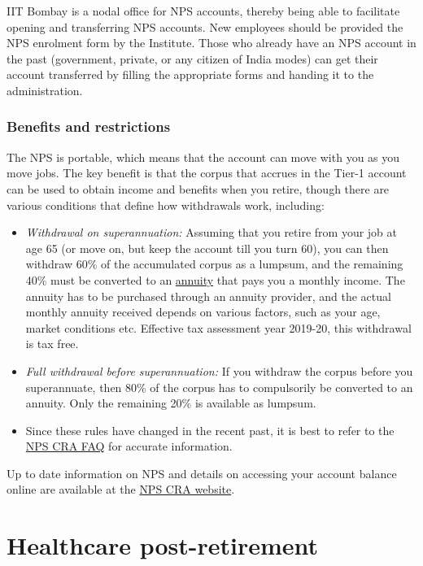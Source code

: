 \documentclass[
  10pt,
  a5paper,
  10pt,
  openany]{amsbook}
\begin{document}
IIT Bombay is a nodal office for NPS accounts, thereby being able to
facilitate opening and transferring NPS accounts. New employees should
be provided the NPS enrolment form by the Institute. Those who already
have an NPS account in the past (government, private, or any citizen of
India modes) can get their account transferred by filling the
appropriate forms and handing it to the administration.

\subsubsection{Benefits and
restrictions}\label{benefits-and-restrictions}

The NPS is portable, which means that the account can move with you as
you move jobs. The key benefit is that the corpus that accrues in the
Tier-1 account can be used to obtain income and benefits when you
retire, though there are various conditions that define how withdrawals
work, including:

\begin{itemize}
\item
  \emph{Withdrawal on superannuation:} Assuming that you retire from
  your job at age 65 (or move on, but keep the account till you turn
  60), you can then withdraw 60\% of the accumulated corpus as a
  lumpsum, and the remaining 40\% must be converted to an
  \href{https://en.wikipedia.org/wiki/Annuity}{annuity} that pays you a
  monthly income. The annuity has to be purchased through an annuity
  provider, and the actual monthly annuity received depends on various
  factors, such as your age, market conditions etc. Effective tax
  assessment year 2019-20, this withdrawal is tax free.
\item
  \emph{Full withdrawal before superannuation:} If you withdraw the
  corpus before you superannuate, then 80\% of the corpus has to
  compulsorily be converted to an annuity. Only the remaining 20\% is
  available as lumpsum.
\item
  Since these rules have changed in the recent past, it is best to refer
  to the \href{https://npscra.nsdl.co.in/nps-faq-withdrawal.php}{NPS CRA
  FAQ} for accurate information.
\end{itemize}

Up to date information on NPS and details on accessing your account
balance online are available at the
\href{https://npscra.nsdl.co.in/}{NPS CRA website}.

\section{Healthcare post-retirement}\label{healthcare-post-retirement}
\end{document}
